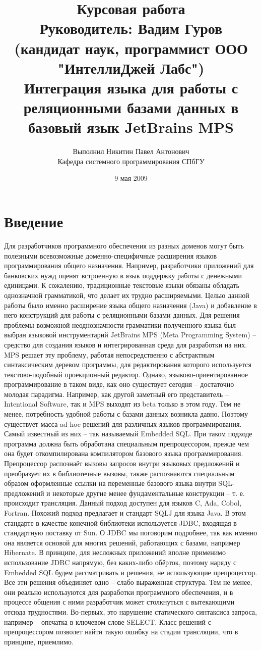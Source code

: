 \documentclass[12pt]{article}
\title{Курсовая работа\\
Руководитель: Вадим Гуров\\
(кандидат наук, программист ООО "ИнтеллиДжей Лабс")\\
Интеграция языка для работы с реляционными базами данных в базовый язык JetBrains MPS}
\author{Выполнил Никитин Павел Антонович\\
Кафедра системного программирования СПбГУ}
\date{9 мая 2009}
\begin{document}
\maketitle	

\section{Введение}

Для разработчиков программного обеспечения из разных доменов могут быть полезными всевозможные доменно-специфичные расширения языков программирования общего назначения. Например, разработчики приложений для банковских нужд оценят встроенную в язык поддержку работы с денежными единицами. К сожалению, традиционные текстовые языки обязаны обладать однозначной грамматикой, что делает их трудно расширяемыми. Целью данной работы было именно расширение языка общего назначения (Java) и добавление в него конструкций для работы с реляционными базами данных. Для решения проблемы возможной неоднозначности грамматики полученного языка был выбран языковой инструментарий JetBrains MPS (Meta Programming System) -- средство для создания языков и интегрированная среда для разработки на них. MPS решает эту проблему, работая непосредственно с абстрактным синтаксическим деревом программы, для редактирования которого используется текстово-подобный проекционный редактор. Однако, языково-ориентированное программирование в таком виде, как оно существует сегодня -- достаточно молодая парадигма. Например, как другой заметный его представитель -- Intentional Software, так и MPS выходят из beta только в этом году. Тем не менее, потребность удобной работы с базами данных возникла давно. Поэтому существует масса ad-hoc решений для различных языков программирования. Самый известный из них -- так называемый Embedded SQL. При таком подходе программа должна быть обработана специальным препроцессором, прежде чем она будет откомпилирована компилятором базового языка программирования. Препроцессор распознаёт вызовы запросов внутри языковых предложений и преобразует их в библиотечные вызовы, также распознаются специальным образом оформленные ссылки на переменные базового языка внутри SQL-предложений и некоторые другие менее фундаментальные конструкции -- т. е. происходит трансляция. Данный подход доступен для языков C, Ada, Cobol, Fortran. Похожий подход предлагает и стандарт SQLJ для языка Java. В этом стандарте в качестве конечной библиотеки используется JDBC, входящая в стандартную поставку от Sun. О JDBC мы поговорим подробнее, так как именно она является основой для многих решений, работающих с базами, например Hibernate. В принципе, для несложных приложений вполне применимо использование JDBC напрямую, без каких-либо обёрток, поэтому наряду с Embedded SQL будем рассматривать и решения, не использующие препроцессор. Все эти решения объединяет одно -- слабо выраженная структура. Тем не менее, они реально используются для разработки программного обеспечения, и в процессе общения с ними разработчик может столкнуться с вытекающими отсюда трудностями. Во-первых, это нарушение статического синтаксиса запроса, например -- опечатка в ключевом слове SELECT. Класс решений с препроцессором позволет найти такую ошибку на стадии трансляции, что в принципе, приемлимо. 
\end{document}
